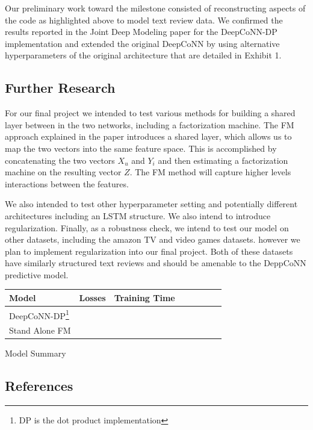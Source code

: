 \documentclass[10pt,twocolumn,letterpaper]{article}
\begin{document}
Our preliminary work toward the milestone consisted of reconstructing aspects of the code as highlighted above to model text review data. We confirmed the results reported in the Joint Deep Modeling paper for the DeepCoNN-DP implementation and extended the original DeepCoNN by using alternative hyperparameters of the original architecture that are detailed in Exhibit 1. 

\subsection{Further Research}

For our final project we intended to test various methods for building a shared layer between in the two networks, including a factorization machine. The FM approach explained in the paper introduces a shared layer, which allows us to map the two vectors into the same feature space. This is accomplished by concatenating the two vectors $X_{u}$ and $Y_{i}$ and then estimating a factorization machine on the resulting vector $Z$. The FM method will capture higher levels interactions between the features.

We also intended to test other hyperparameter setting and potentially different architectures including an LSTM structure. We also intend to introduce regularization. Finally, as a robustness check, we intend to test our model on other datasets, including the amazon TV and video games datasets. however we plan to implement regularization into our final project. Both of these datasets have similarly structured text reviews and should be amenable to the DeppCoNN predictive model. 




\begin{exhibit}
\begin{center}
{\small
\begin{tabular}{l|ccccccc}
\hline
Model & Losses & Training Time & & & &  &\\
\hline
DeepCoNN-DP\footnote{DP is the dot product implementation} & & & & & & & \\
Stand Alone FM & & & & & & &\\
\hline
\end{tabular}
}
\end{center}
\label{table2}
\caption{Model Summary}
\end{exhibit}

\subsection{References}
\end{document}
